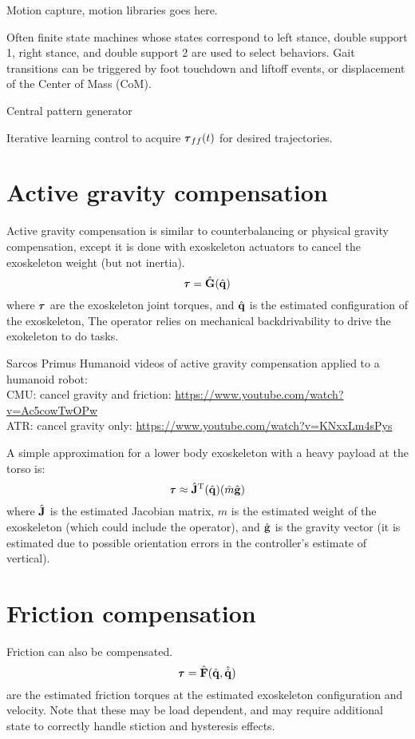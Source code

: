 \documentclass[letterpaper,12pt,fullpage]{article}
\begin{document}
Motion capture, motion libraries goes here.

Often finite state machines whose states correspond to left stance, double support 1,
right stance, and double support 2 are used to select behaviors. Gait transitions
can be triggered by foot touchdown and liftoff events, or
displacement of the Center of Mass (CoM).

Central pattern generator

Iterative learning control to acquire $\vtau_{ff}(t)$ for desired trajectories.

\section{Active gravity compensation}

Active gravity compensation is similar 
to counterbalancing or physical gravity compensation, except it is done
with exoskeleton actuators to cancel the exoskeleton weight (but not inertia).
\begin{equation}
\vtau = \hat{\mG}(\hat{\vq})
\end{equation}
where $\vtau$ are the exoskeleton joint torques, 
and $\hat{{\bf q}}$ is the estimated configuration of the exoskeleton,
The operator relies on mechanical backdrivability to drive
the exokeleton to do tasks.

Sarcos Primus Humanoid videos of active gravity compensation applied
to a humanoid robot:\\
CMU: cancel gravity and friction: \url{https://www.youtube.com/watch?v=Ac5cowTwOPw}\\
ATR: cancel gravity only: \url{https://www.youtube.com/watch?v=KNxxLm4sPys}

A simple approximation for a lower body exoskeleton with a heavy payload at the
torso is:
\begin{equation}
\vtau \approx \hat{\mJ}^{\tr}(\hat{\vq}) (\hat{m} \hat{\vg})
\end{equation}
where $\hat{{\bf J}}$ is the estimated Jacobian matrix,
$\hat{m}$ is the estimated
weight of the exoskeleton (which could include the operator),
and $\hat{{\bf g}}$ is the gravity vector (it is estimated due to possible orientation
errors in the controller's estimate of vertical). 

\section{Friction compensation}

Friction can also be compensated.
\begin{equation}
\vtau = \hat{\mF}(\hat{\vq},\hat{\dot{\vq}}) 
\end{equation}
are the estimated friction torques at the estimated exoskeleton configuration
and velocity.
Note that these may be load dependent, and may require additional state to
correctly handle stiction and hysteresis effects.
\end{document}
